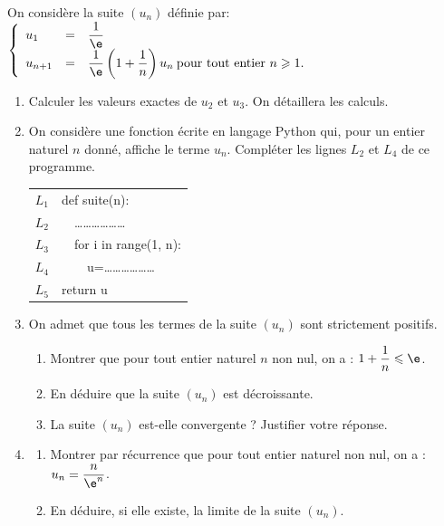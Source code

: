 \medskip

On considère la suite $\left(u_{n}\right)$ définie par: $\left\{\begin{array}{l c l}
u_{1}&=&\dfrac{1}{\e} \\
u_{n+1}&=&\dfrac{1}{\e}\left(1+\dfrac{1}{n}\right) u_{n}\: \text {pour tout entier } n \geqslant 1.\end{array}\right.$

\begin{enumerate}
	\item Calculer les valeurs exactes de $u_{2}$ et $u_{3}$. On détaillera les calculs.

	\item On considère une fonction écrite en langage Python qui, pour un entier naturel $n$ donné, affiche le terme $u_{n}$. Compléter les lignes $L_{2}$ et $L_{4}$ de ce programme.

	\begin{center}
		\begin{tabular}{|c|>{\ttfamily}l|}
			\hline
			$L_{1}$ & def suite(n): \\
			$L_{2}$ & ~~\ldots \ldots \ldots \ldots \ldots \ldots \\
			$L_{3}$ & ~~for i in range(1, n): \\
			$L_{4}$ & ~~~~u=\ldots \ldots \ldots \ldots \ldots \ldots\\
			$L_{5}$ & return u \\
			\hline
		\end{tabular}
	\end{center}

	\item On admet que tous les termes de la suite $\left(u_{n}\right)$ sont strictement positifs.
	\begin{enumerate}
		\item Montrer que pour tout entier naturel $n$ non nul, on a : $1+\dfrac{1}{n} \leqslant \e$.

		\item En déduire que la suite $\left(u_{n}\right)$ est décroissante.
		\item La suite $\left(u_{n}\right)$ est-elle convergente ? Justifier votre réponse.
	\end{enumerate}

	\item \begin{enumerate}
		\item Montrer par récurrence que pour tout entier naturel non nul, on a : \quad $u_{n}=\dfrac{n}{\e^{n}}$.
		\item En déduire, si elle existe, la limite de la suite $\left(u_{n}\right)$.
	\end{enumerate}
\end{enumerate}
